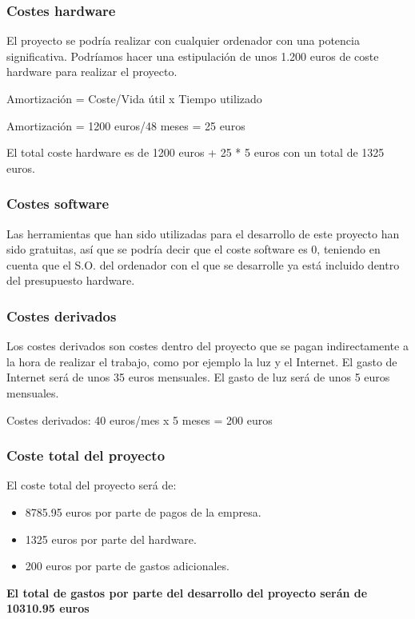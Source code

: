 \subsubsection{Costes hardware}
El proyecto se podría realizar con cualquier ordenador con una potencia significativa.
Podríamos hacer una estipulación de unos 1.200 euros de coste hardware para realizar el proyecto.

Amortización = Coste/Vida útil x Tiempo utilizado

Amortización = 1200 euros/48 meses = 25 euros

El total coste hardware es de 1200 euros + 25 * 5 euros con un total de 1325 euros.

\subsubsection{Costes software}
Las herramientas que han sido utilizadas para el desarrollo de este proyecto han sido gratuitas, así que se podría decir que el coste software es 0, teniendo en cuenta que el S.O. del ordenador con el que se desarrolle ya está incluido dentro del presupuesto hardware.

\subsubsection{Costes derivados}
Los costes derivados son costes dentro del proyecto que se pagan indirectamente a la hora de realizar el trabajo, como por ejemplo la luz y el Internet.
El gasto de Internet será de unos 35 euros mensuales.
El gasto de luz será de unos 5 euros mensuales.

Costes derivados: 
40 euros/mes x 5 meses = 200 euros

\subsubsection{Coste total del proyecto}

El coste total del proyecto será de:

\begin{itemize}
	\item 8785.95 euros por parte de pagos de la empresa.
	\item 1325 euros por parte del hardware.
	\item 200 euros por parte de gastos adicionales.
\end{itemize}

\textbf{El total de gastos por parte del desarrollo del proyecto serán de 10310.95 euros}

